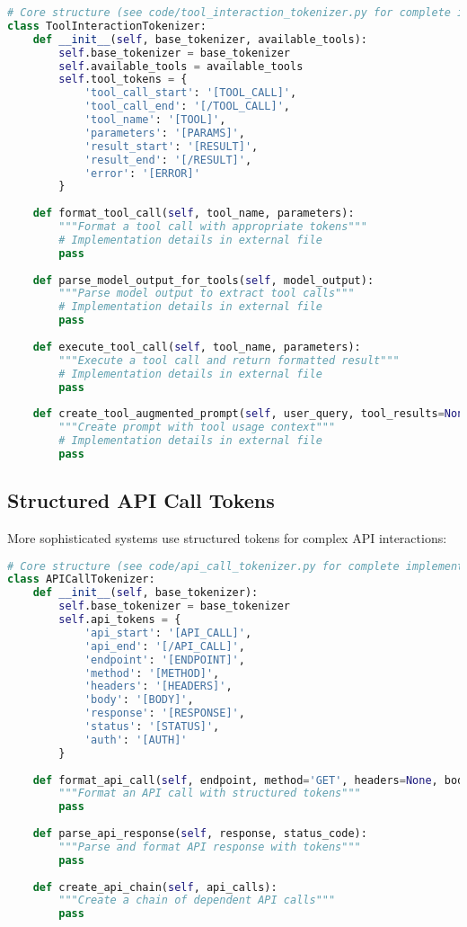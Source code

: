 \begin{lstlisting}[language=Python, caption=Basic tool invocation token system]
# Core structure (see code/tool_interaction_tokenizer.py for complete implementation)
class ToolInteractionTokenizer:
    def __init__(self, base_tokenizer, available_tools):
        self.base_tokenizer = base_tokenizer
        self.available_tools = available_tools
        self.tool_tokens = {
            'tool_call_start': '[TOOL_CALL]',
            'tool_call_end': '[/TOOL_CALL]',
            'tool_name': '[TOOL]',
            'parameters': '[PARAMS]',
            'result_start': '[RESULT]',
            'result_end': '[/RESULT]',
            'error': '[ERROR]'
        }
        
    def format_tool_call(self, tool_name, parameters):
        """Format a tool call with appropriate tokens"""
        # Implementation details in external file
        pass
    
    def parse_model_output_for_tools(self, model_output):
        """Parse model output to extract tool calls"""
        # Implementation details in external file
        pass
    
    def execute_tool_call(self, tool_name, parameters):
        """Execute a tool call and return formatted result"""
        # Implementation details in external file
        pass
    
    def create_tool_augmented_prompt(self, user_query, tool_results=None):
        """Create prompt with tool usage context"""
        # Implementation details in external file
        pass
\end{lstlisting}

\subsection{Structured API Call Tokens}

More sophisticated systems use structured tokens for complex API interactions:

\begin{lstlisting}[language=Python, caption=Structured API call tokenization]
# Core structure (see code/api_call_tokenizer.py for complete implementation)
class APICallTokenizer:
    def __init__(self, base_tokenizer):
        self.base_tokenizer = base_tokenizer
        self.api_tokens = {
            'api_start': '[API_CALL]',
            'api_end': '[/API_CALL]',
            'endpoint': '[ENDPOINT]',
            'method': '[METHOD]',
            'headers': '[HEADERS]',
            'body': '[BODY]',
            'response': '[RESPONSE]',
            'status': '[STATUS]',
            'auth': '[AUTH]'
        }
    
    def format_api_call(self, endpoint, method='GET', headers=None, body=None, auth=None):
        """Format an API call with structured tokens"""
        pass
    
    def parse_api_response(self, response, status_code):
        """Parse and format API response with tokens"""
        pass
    
    def create_api_chain(self, api_calls):
        """Create a chain of dependent API calls"""
        pass
\end{lstlisting}

